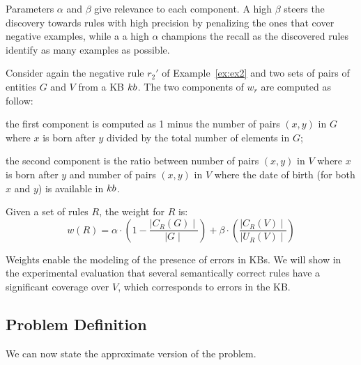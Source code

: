 Parameters $\alpha$ and $\beta$ give relevance to each component. A high $\beta$ steers the discovery towards rules with high precision by penalizing the ones that cover negative examples, %
while a a high $\alpha$ champions the recall as the discovered rules identify as many examples as possible.

\begin{example}
	Consider again the negative rule $r_2'$ of Example~\ref{ex:ex2} and two sets of pairs of entities $G$ and $V$ from a KB ${\sc kb}$. The two components of $w_r$ are computed as follow:
	\begin{inparaenum}[\itshape1)]
		\item the first component is computed as 1 minus the number of pairs $(x,y)$ in $G$ where
		$x$ is born after $y$ divided by the total number of elements in $G$;
		\item the second component is the ratio between number of pairs $(x,y)$ in $V$ where $x$ is born after $y$ and number of pairs $(x,y)$ in $V$ where the date of birth (for both $x$ and $y$) is available in ${\sc kb}$.
	\end{inparaenum}
\end{example}

\begin{definition}
	Given a set of rules $R$, the weight for $R$ is:
	\begin{equation*}
		w(R) = \alpha \cdot (1-\frac{\mid C_{R}(G)\mid}{\mid G \mid}) +\beta \cdot (\frac{\mid C_{R}(V) \mid}{\mid U_{R}(V)\mid})
	\end{equation*}
\end{definition}

Weights enable the modeling  of the presence of errors in KBs. We will show in the experimental evaluation that several semantically correct rules have a significant coverage over $V$, which corresponds to errors in the KB. 


\subsection{Problem Definition} \label{sec:krd_prob_def}
We can now state the approximate version of the problem.

